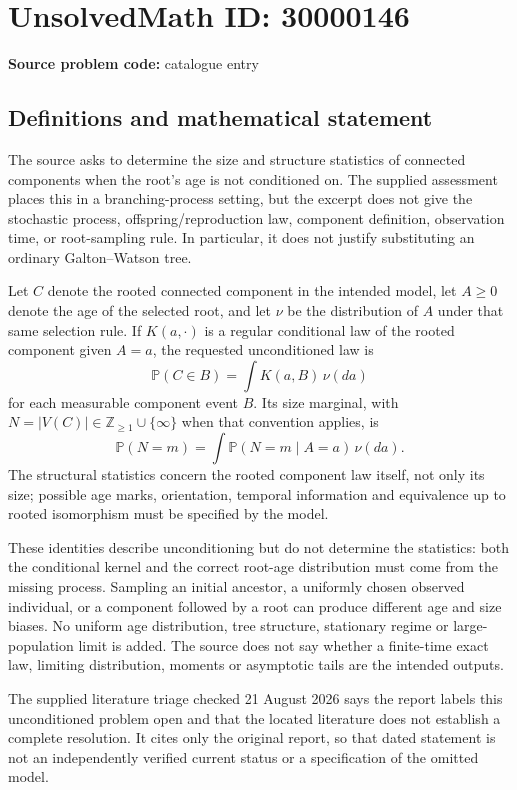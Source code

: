 \documentclass[11pt]{article}
\newcommand{\Z}{\mathbb{Z}}
\begin{document}
\section*{UnsolvedMath ID: 30000146}
\textbf{Source problem code:} catalogue entry
\subsection{Definitions and mathematical statement}
The source asks to determine the size and structure statistics of connected components when the root's age is not conditioned on. The supplied assessment places this in a branching-process setting, but the excerpt does not give the stochastic process, offspring/reproduction law, component definition, observation time, or root-sampling rule. In particular, it does not justify substituting an ordinary Galton--Watson tree.

Let $C$ denote the rooted connected component in the intended model, let $A\geq0$ denote the age of the selected root, and let $\nu$ be the distribution of $A$ under that same selection rule. If $K(a,\cdot)$ is a regular conditional law of the rooted component given $A=a$, the requested unconditioned law is
\[
 \mathbb P(C\in B)=\int K(a,B)\,\nu(da)
\]
for each measurable component event $B$. Its size marginal, with $N=|V(C)|\in\Z_{\geq1}\cup\{\infty\}$ when that convention applies, is
\[
 \mathbb P(N=m)=\int\mathbb P(N=m\mid A=a)\,\nu(da).
\]
The structural statistics concern the rooted component law itself, not only its size; possible age marks, orientation, temporal information and equivalence up to rooted isomorphism must be specified by the model.

These identities describe unconditioning but do not determine the statistics: both the conditional kernel and the correct root-age distribution must come from the missing process. Sampling an initial ancestor, a uniformly chosen observed individual, or a component followed by a root can produce different age and size biases. No uniform age distribution, tree structure, stationary regime or large-population limit is added. The source does not say whether a finite-time exact law, limiting distribution, moments or asymptotic tails are the intended outputs.

The supplied literature triage checked 21 August 2026 says the report labels this unconditioned problem open and that the located literature does not establish a complete resolution. It cites only the original report, so that dated statement is not an independently verified current status or a specification of the omitted model.
\end{document}
